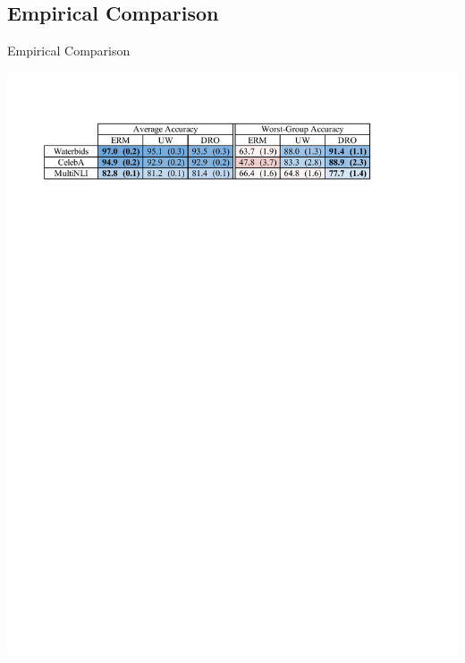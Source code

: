 \documentclass{beamer}
\begin{document}
\subsection{Empirical Comparison}
\begin{viterbiframe}{Empirical Comparison}
        \begin{table}[th]
        \includegraphics[width=\textwidth]{img/table_3.pdf}
        \caption{Comparison of ERM, upweighting (UW), and group DRO models.
          }
        \label{tab:benchmark}
        \end{table}
\end{viterbiframe}
\end{document}
